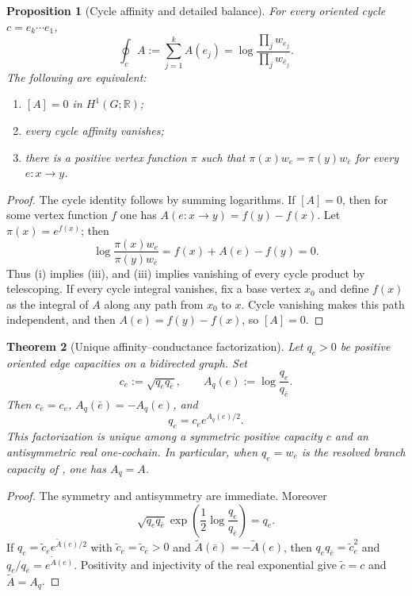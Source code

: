 \documentclass[11pt]{article}
\newtheorem{theorem}{Theorem}[section]
\newtheorem{proposition}[theorem]{Proposition}
\theoremstyle{definition}
\theoremstyle{remark}
\newcommand{\R}{\mathbb R}
\begin{document}
\begin{proposition}[Cycle affinity and detailed balance]
\label{prop:affinity-detailed-balance}
For every oriented cycle $c=e_k\cdots e_1$,
\[
 \oint_c A:=\sum_{j=1}^{k}A(e_j)
 =\log\frac{\prod_jw_{e_j}}{\prod_jw_{\bar e_j}}.
\]
The following are equivalent:
\begin{enumerate}[label=\textup{(\roman*)},leftmargin=2.4em]
\item $[A]=0$ in $H^1(G;\R)$;
\item every cycle affinity vanishes;
\item there is a positive vertex function $\pi$ such that
      $\pi(x)w_e=\pi(y)w_{\bar e}$ for every $e:x\to y$.
\end{enumerate}
\end{proposition}

\begin{proof}
The cycle identity follows by summing logarithms.  If $[A]=0$, then for some vertex function $f$ one has
$A(e:x\to y)=f(y)-f(x)$.  Let $\pi(x)=e^{f(x)}$; then
\[
 \log\frac{\pi(x)w_e}{\pi(y)w_{\bar e}}
 =f(x)+A(e)-f(y)=0.
\]
Thus (i) implies (iii), and (iii) implies vanishing of every cycle product by
telescoping.  If every cycle integral vanishes, fix a base vertex $x_0$ and
define $f(x)$ as the integral of $A$ along any path from $x_0$ to $x$.  Cycle
vanishing makes this path independent, and then $A(e)=f(y)-f(x)$, so $[A]=0$.
\end{proof}

\begin{theorem}[Unique affinity--conductance factorization]
\label{thm:affinity-conductance}
Let $q_e>0$ be positive oriented edge capacities on a bidirected graph.  Set
\[
 c_e:=\sqrt{q_e q_{\bar e}},
 \qquad
 A_q(e):=\log\frac{q_e}{q_{\bar e}}.
\]
Then $c_{\bar e}=c_e$, $A_q(\bar e)=-A_q(e)$, and
\[
 \boxed{q_e=c_e e^{A_q(e)/2}.}
\]
This factorization is unique among a symmetric positive capacity $c$ and an
antisymmetric real one-cochain.  In particular, when $q_e=w_e$ is the resolved
branch capacity of , one has $A_q=A$.
\end{theorem}

\begin{proof}
The symmetry and antisymmetry are immediate.  Moreover
\[
 \sqrt{q_e q_{\bar e}}
 \exp\!\left(\frac12\log\frac{q_e}{q_{\bar e}}\right)=q_e.
\]
If $q_e=\tilde c_e e^{\tilde A(e)/2}$ with
$\tilde c_e=\tilde c_{\bar e}>0$ and
$\tilde A(\bar e)=-\tilde A(e)$, then
$q_e q_{\bar e}=\tilde c_e^2$ and
$q_e/q_{\bar e}=e^{\tilde A(e)}$.  Positivity and injectivity of the real
exponential give $\tilde c=c$ and $\tilde A=A_q$.
\end{proof}
\end{document}
